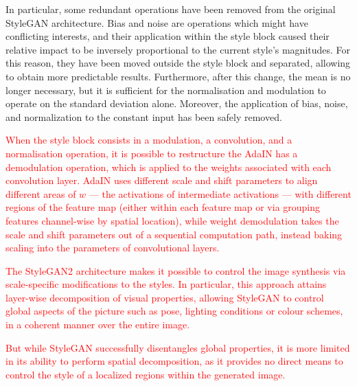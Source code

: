 \documentclass{article}
\begin{document}
	In particular, some redundant operations have been removed from the original StyleGAN architecture.
	Bias and noise are operations which might have conflicting interests, and their application within the 
	style block caused their relative impact to be inversely proportional to the current style’s 
	magnitudes. For this reason, they have been moved outside the style block and separated, allowing 
	to obtain more predictable results.
	Furthermore, after this change, the mean is no longer necessary, but it is sufficient for the 
	normalisation and modulation to operate on the standard deviation alone.
	Moreover, the application of bias, noise, and normalization to the constant input has been safely 
	removed. 
	
	\textcolor{red}{
		When the style block consists in a modulation, a convolution, and a normalisation operation, it is 
		possible to restructure the AdaIN has a demodulation operation, which is applied to the weights 
		associated with each convolution layer. 
		AdaIN uses different scale and shift parameters to align different areas of $w$ — the activations 
		of 
		intermediate activations — with different regions of the feature map (either within each feature 
		map 
		or via grouping features channel-wise by spatial location), while weight demodulation takes the 
		scale 
		and shift parameters out of a sequential computation path, instead baking scaling into the 
		parameters of convolutional layers.}
	
	\textcolor{red}{
		The StyleGAN2 architecture makes it possible to control the image synthesis via scale-specific 
		modifications to the styles. In particular, this approach attains layer-wise decomposition of visual 
		properties, allowing StyleGAN to control global aspects of the picture such as pose, lighting 
		conditions or colour schemes, in a coherent manner over the entire image.}
	
	\textcolor{red}{
		But while StyleGAN successfully disentangles global properties, it is more limited in its ability to 
		perform spatial decomposition, as it provides no direct means to control the style of a localized 
		regions within the generated image.}
	
	
\end{document}
